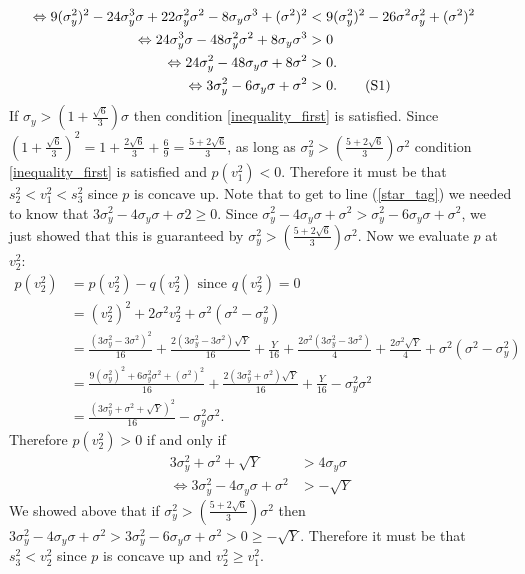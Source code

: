 \documentclass{article}
\newcommand\numberthis{\addtocounter{equation}{1}\tag{\theequation}}
\begin{document}
\begin{enumerate}
\begin{align*}
\\ \Leftrightarrow 9(\sigma_y^2)^2-24\sigma_y^3\sigma+22\sigma_y^2\sigma^2-8\sigma_y\sigma^3+(\sigma^2)^2&<9(\sigma_y^2)^2-26\sigma^2\sigma_y^2+(\sigma^2)^2
\\ \Leftrightarrow 24\sigma_y^3\sigma-48\sigma_y^2\sigma^2+8\sigma_y\sigma^3&>0
\\ \Leftrightarrow 24\sigma_y^2-48\sigma_y\sigma+8\sigma^2&>0.
\\ \Leftrightarrow 3\sigma_y^2-6\sigma_y\sigma+\sigma^2&>0. \numberthis \label{inequality_first}
\end{align*}
If $\sigma_y> (1+\frac{\sqrt{6}}{3})\sigma$ then condition \ref{inequality_first} is satisfied. Since $(1+\frac{\sqrt{6}}{3})^2=1+\frac{2\sqrt{6}}{3}+\frac{6}{9}=\frac{5+2\sqrt{6}}{3}$, as long as $\sigma_y^2>\left(\frac{5+2\sqrt{6}}{3}\right)\sigma^2$ condition \ref{inequality_first} is satisfied and $p(v_1^2)<0$. Therefore it must be that $s_2^2<v_1^2<s_3^2$ since $p$ is concave up. Note that to get to line (\ref{star_tag}) we needed to know that $3\sigma_y^2-4\sigma_y\sigma+\sigma2\geq0$. Since $\sigma_y^2-4\sigma_y\sigma+\sigma^2>\sigma_y^2-6\sigma_y\sigma+\sigma^2$, we just showed that this is guaranteed by $\sigma_y^2>\left(\frac{5+2\sqrt{6}}{3}\right)\sigma^2$. Now we evaluate $p$ at $v_2^2$:
\begin{align*}
p(v_2^2)&=p(v_2^2)-q(v_2^2) \text{ since } q(v_2^2)=0
\\ &=(v_2^2)^2+2\sigma^2v_2^2+\sigma^2(\sigma^2-\sigma_y^2)
\\ &= \frac{(3\sigma_y^2-3\sigma^2)^2}{16}+\frac{2(3\sigma_y^2-3\sigma^2)\sqrt{Y}}{16}+\frac{Y}{16}+\frac{2\sigma^2(3\sigma_y^2-3\sigma^2)}{4}+\frac{2\sigma^2\sqrt{Y}}{4}+\sigma^2(\sigma^2-\sigma_y^2)
\\&=\frac{9(\sigma_y^2)^2+6\sigma_y^2\sigma^2+(\sigma^2)^2}{16}+\frac{2(3\sigma_y^2+\sigma^2)\sqrt{Y}}{16}+\frac{Y}{16}-\sigma_y^2\sigma^2
\\&=\frac{(3\sigma_y^2+\sigma^2+\sqrt{Y})^2}{16}-\sigma_y^2\sigma^2.
\end{align*}
Therefore $p(v_2^2)>0$ if and only if 
\begin{align*}
3\sigma_y^2+\sigma^2+\sqrt{Y}&>4\sigma_y\sigma
\\ \Leftrightarrow 3\sigma_y^2-4\sigma_y\sigma+\sigma^2&>-\sqrt{Y}
\end{align*}
We showed above that if $\sigma_y^2>\left(\frac{5+2\sqrt{6}}{3}\right)\sigma^2$ then $3\sigma_y^2-4\sigma_y\sigma+\sigma^2>3\sigma_y^2-6\sigma_y\sigma+\sigma^2>0\geq-\sqrt{Y}$. Therefore it must be that $s_3^2<v_2^2$ since $p$ is concave up and $v_2^2\geq v_1^2$. 



\end{enumerate}
\end{document}
